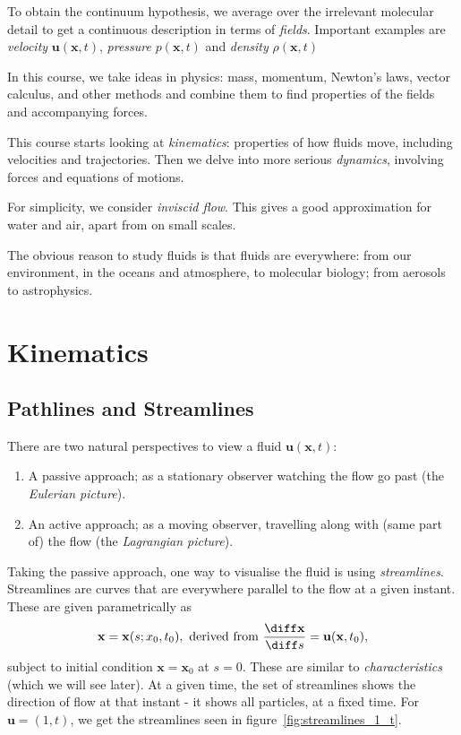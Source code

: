 \documentclass[12pt]{article}
\begin{document}
To obtain the continuum hypothesis, we average over the irrelevant molecular detail to get a continuous description in terms of \emph{fields}. Important examples are \emph{velocity} $\mathbf{u}(\mathbf{x},t)$, \emph{pressure} $p(\mathbf{x},t)$ and \emph{density} $\rho(\mathbf{x}, t)$

In this course, we take ideas in physics: mass, momentum, Newton's laws, vector calculus, and other methods and combine them to find properties of the fields and accompanying forces.

This course starts looking at \emph{kinematics}: properties of how fluids move, including velocities and trajectories. Then we delve into more serious \emph{dynamics}, involving forces and equations of motions.

For simplicity, we consider \emph{inviscid flow}. This gives a good approximation for water and air, apart from on small scales.

The obvious reason to study fluids is that fluids are everywhere: from our environment, in the oceans and atmosphere, to molecular biology; from aerosols to astrophysics.

\newpage

\section{Kinematics}
\label{sec:kinematics}

\subsection{Pathlines and Streamlines}
\label{sub:pathlines_and_streamlines}

There are two natural perspectives to view a fluid $\mathbf{u}(\mathbf{x}, t)$:
\begin{enumerate}
	\item A passive approach; as a stationary observer watching the flow go past (the \emph{Eulerian picture}).
	\item An active approach; as a moving observer, travelling along with (same part of) the flow (the \emph{Lagrangian picture}).
\end{enumerate}

Taking the passive approach, one way to visualise the fluid is using \emph{streamlines}. Streamlines are curves that are everywhere parallel to the flow at a given instant. These are given parametrically as
\[
	\mathbf{x} = \mathbf{x}(s;x_0, t_0), \text{ derived from } \frac{\diff \mathbf{x}}{\diff s} = \mathbf{u}(\mathbf{x}, t_0)
,\]
subject to initial condition $\mathbf{x} = \mathbf{x}_0$ at $s = 0$. These are similar to \emph{characteristics} (which we will see later). At a given time, the set of streamlines shows the direction of flow at that instant - it shows all particles, at a fixed time. For $\mathbf{u} = (1, t)$, we get the streamlines seen in figure~\ref{fig:streamlines_1_t}.
\end{document}
